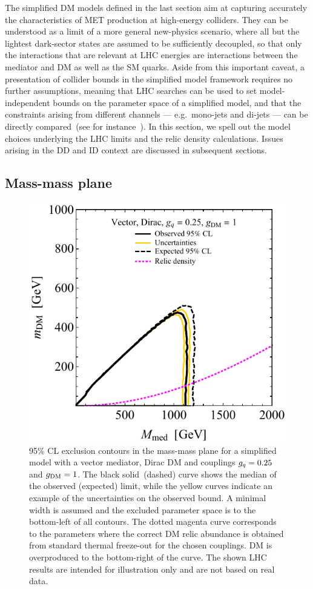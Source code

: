 
The simplified DM models  defined in the last section  aim at capturing  accurately  the characteristics of MET production at high-energy colliders. They can be understood as a limit of a more general new-physics scenario, where all but the lightest dark-sector states are assumed to be sufficiently decoupled, so that only the interactions that are relevant at LHC energies are interactions between the mediator and DM as well as the SM quarks. 
Aside from this important caveat, a presentation of collider bounds in the simplified model framework requires no further assumptions, meaning  that LHC searches can be used to set model-independent bounds on the parameter space of a simplified model, and that the constraints arising from different channels --- e.g.~mono-jets and di-jets --- can be directly compared~(see for instance~\cite{Chala:2015ama}).  In this section, we spell out the model choices underlying the LHC limits and the relic density calculations.  
Issues arising in the DD and ID context are discussed in subsequent sections.


\subsection{Mass-mass plane}

\label{mass-massplane}

\begin{figure}[!t]
	\centering
	\includegraphics[width=0.6 \textwidth]{figure1.pdf}
	\caption{95\% CL exclusion contours in the mass-mass plane for a simplified model with a vector mediator, Dirac DM and couplings $g_q = 0.25$ and $g_{\rm{DM}} = 1$. The black solid~(dashed) curve shows the median of the observed (expected) limit, while the yellow curves indicate an example of the uncertainties on the observed bound.  A minimal width is assumed and the excluded parameter space is to the bottom-left of all contours. The dotted magenta curve corresponds to the parameters where the correct DM relic abundance is obtained  from standard thermal freeze-out for the chosen couplings. DM is overproduced to the bottom-right of the curve. The shown  LHC results are intended for illustration only and are not based on real data. }   
	\label{fig:massmass}
\end{figure}

